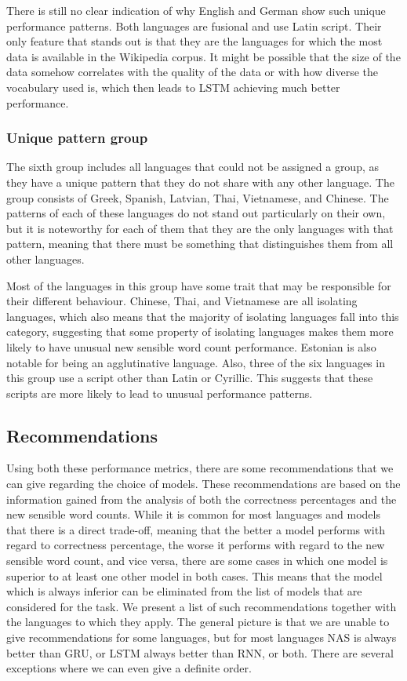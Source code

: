 \documentclass[11pt,a4paper,twoside,openright]{scrbook}
\begin{document}
There is still no clear indication of why English and German show such unique performance patterns. Both languages are fusional and use Latin script. Their only feature that stands out is that they are the languages for which the most data is available in the Wikipedia corpus. It might be possible that the size of the data somehow correlates with the quality of the data or with how diverse the vocabulary used is, which then leads to LSTM achieving much better performance. 

\subsubsection{Unique pattern group}
The sixth group includes all languages that could not be assigned a group, as they have a unique pattern that they do not share with any other language. The group consists of Greek, Spanish, Latvian, Thai, Vietnamese, and Chinese. The patterns of each of these languages do not stand out particularly on their own, but it is noteworthy for each of them that they are the only languages with that pattern, meaning that there must be something that distinguishes them from all other languages. 

Most of the languages in this group have some trait that may be responsible for their different behaviour. Chinese, Thai, and Vietnamese are all isolating languages, which also means that the majority of isolating languages fall into this category, suggesting that some property of isolating languages makes them more likely to have unusual new sensible word count performance. Estonian is also notable for being an agglutinative language. Also, three of the six languages in this group use a script other than Latin or Cyrillic. This suggests that these scripts are more likely to lead to unusual performance patterns. 

\subsection{Recommendations}
Using both these performance metrics, there are some recommendations that we can give regarding the choice of models. These recommendations are based on the information gained from the analysis of both the correctness percentages and the new sensible word counts. While it is common for most languages and models that there is a direct trade-off, meaning that the better a model performs with regard to correctness percentage, the worse it performs with regard to the new sensible word count, and vice versa, there are some cases in which one model is superior to at least one other model in both cases. This means that the model which is always inferior can be eliminated from the list of models that are considered for the task. We present a list of such recommendations together with the languages to which they apply. The general picture is that we are unable to give recommendations for some languages, but for most languages  NAS is always better than GRU, or LSTM always better than RNN, or both. There are several exceptions where we can even give a definite order. 
\end{document}
